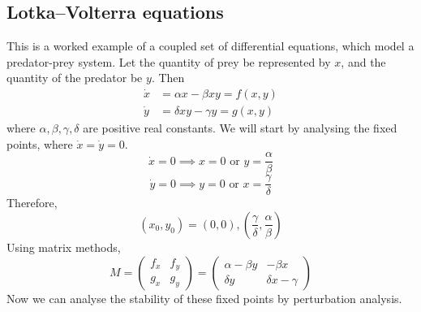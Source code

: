 \subsection{Lotka--Volterra equations}
This is a worked example of a coupled set of differential equations, which model a predator-prey system.
Let the quantity of prey be represented by \(x\), and the quantity of the predator be \(y\).
Then
\begin{align*}
	\dot x & = \alpha x - \beta xy = f(x, y) \\
	\dot y & = \delta xy - \gamma y = g(x,y)
\end{align*}
where \(\alpha, \beta, \gamma, \delta\) are positive real constants.
We will start by analysing the fixed points, where \(\dot x = \dot y = 0\).
\[
	\dot x = 0 \implies x=0 \text{ or } y = \frac{\alpha}{\beta}
\]
\[
	\dot y = 0 \implies y=0 \text{ or } x = \frac{\gamma}{\delta}
\]
Therefore,
\[
	(x_0, y_0) = (0, 0), \left( \frac{\gamma}{\delta}, \frac{\alpha}{\beta} \right)
\]
Using matrix methods,
\[
	M = \begin{pmatrix}
		f_x & f_y \\
		g_x & g_y
	\end{pmatrix} = \begin{pmatrix}
		\alpha - \beta y & -\beta x          \\
		\delta y         & \delta x - \gamma
	\end{pmatrix}
\]
Now we can analyse the stability of these fixed points by perturbation analysis.
